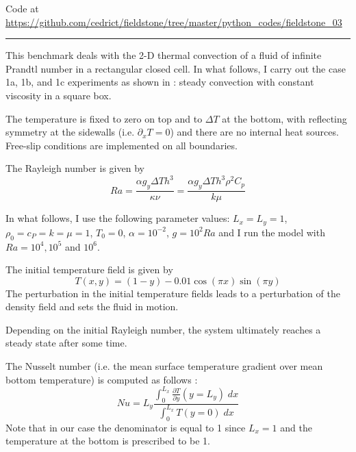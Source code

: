 

\begin{center}
Code at \url{https://github.com/cedrict/fieldstone/tree/master/python_codes/fieldstone_03}
\end{center}

\par\noindent\rule{\textwidth}{0.4pt}

This benchmark deals with the 2-D thermal convection of a fluid 
of infinite Prandtl number in a rectangular closed cell.
In what follows, I carry out the case 1a, 1b, and 1c experiments as shown in \cite{blbc89}:
steady convection with constant viscosity in a square box.

The temperature is fixed to zero on top and to $\Delta T$ at the bottom, 
with reflecting symmetry at the sidewalls (i.e. $\partial_x T=0$) 
and there are no internal heat sources. 
Free-slip conditions are implemented on all boundaries. 

The Rayleigh number is given by
\begin{equation}
Ra = \frac{\alpha g_y \Delta T h^3 }{\kappa \nu}
=\frac{\alpha g_y \Delta T h^3 \rho^2 C_p}{k \mu}
\end{equation}

In what follows, I use the following parameter values:  %
$L_x=L_y=1$,$\rho_0=c_P=k=\mu=1$, $T_0=0$, $\alpha=10^{-2}$, $g=10^{2}Ra$
and I run the model with $Ra=10^4,10^{5}$ and $10^6$.

The initial temperature field is given by 
\begin{equation}
T(x,y)=(1-y) - 0.01\cos(\pi x) \sin(\pi y)
\end{equation}
The perturbation in the initial temperature fields leads to 
a perturbation of the density field and sets the fluid in motion. 

Depending on the initial Rayleigh number, the system ultimately reaches a 
steady state after some time. 

The Nusselt number (i.e. the mean surface temperature gradient over mean bottom temperature)
is computed as follows \cite{blbc89}:
\begin{equation}
Nu = L_y \frac{\int_0^{L_x} \frac{\partial T}{\partial y}(y=L_y) \; dx  }{\int_0^{L_x} T(y=0) \; dx}
\label{eqNu}
\end{equation}
Note that in our case the denominator is equal to 1 since $L_x=1$ and the temperature at the 
bottom is prescribed to be 1.

